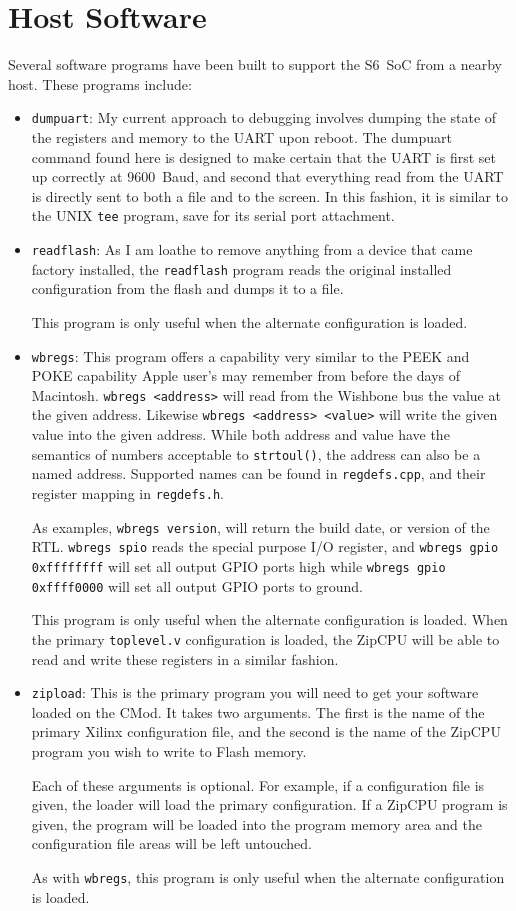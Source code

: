 \documentclass{gqtekspec}
\begin{document}
\section{Host Software}
Several software programs have been built to support the S6~SoC from a nearby
host.  These programs include:
\begin{itemize}
\item {\tt dumpuart}: My current approach to debugging involves dumping the
	state of the registers and memory to the UART upon reboot.  The
	dumpuart command found here is designed to make certain that the UART
	is first set up correctly at 9600~Baud, and second that everything
	read from the UART is directly sent to both a file and to the screen.
	In this fashion, it is similar to the UNIX {\tt tee} program, save for
	its serial port attachment.
\item {\tt readflash}: As I am loathe to remove anything from a device that
	came factory installed, the {\tt readflash} program reads the original
	installed configuration from the flash and dumps it to a file.

	This program is only useful when the alternate configuration is loaded.

\item {\tt wbregs}: This program offers a capability very similar to the
	PEEK and POKE capability Apple user's may remember from before the
	days of Macintosh.  {\tt wbregs <address>} will read from the
	Wishbone bus the value at the given address.  Likewise
	{\tt wbregs <address> <value>} will write the given value into the
	given address.  While both address and value have the semantics of
	numbers acceptable to {\tt strtoul()}, the address can also be a named
	address.  Supported names can be found in {\tt regdefs.cpp}, and their
	register mapping in {\tt regdefs.h}.

	As examples, {\tt wbregs version}, will return the build date, or
	version of the RTL.  {\tt wbregs spio} reads the special purpose
	I/O register, and {\tt wbregs gpio 0xffffffff} will set all output
	GPIO ports high while {\tt wbregs gpio 0xffff0000} will set all
	output GPIO ports to ground.

	This program is only useful when the alternate configuration is loaded.
	When the primary {\tt toplevel.v} configuration is loaded, the ZipCPU
	will be able to read and write these registers in a similar fashion.

\item {\tt zipload}: This is the primary program you will need to get your
	software loaded on the CMod.  It takes two arguments.  The first is
	the name of the primary Xilinx configuration file, and the second is
	the name of the ZipCPU program you wish to write to Flash memory.

	Each of these arguments is optional.  For example, if a configuration
	file is given, the loader will load the primary configuration.  If
	a ZipCPU program is given, the program will be loaded into the program
	memory area and the configuration file areas will be left untouched.

	As with {\tt wbregs}, this program is only useful when the alternate
	configuration is loaded.
\end{itemize}
\end{document}
